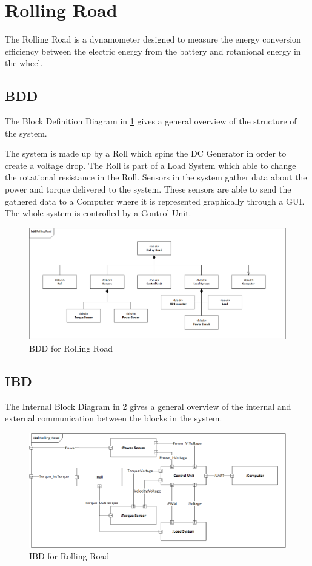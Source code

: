 \section{Rolling Road}
The Rolling Road is a dynamometer designed to measure the energy conversion efficiency  between the electric energy from the battery and rotanional energy in the wheel.

\subsection{BDD}
The Block Definition Diagram in \ref{fig:RR_BDD} gives a general overview of the structure of the system.

The system is made up by a Roll which spins the DC Generator in order to create a voltage drop. The Roll is part of a Load System which able to change the rotational resistance in the Roll.
Sensors in the system gather data about the power and torque delivered to the system. These sensors are able to send the gathered data to a Computer where it is represented graphically through a GUI. The whole system is controlled by a Control Unit.

\begin{figure}[H]
	\centering
	\includegraphics[width=0.9\linewidth]{Architecture/BDD_RollingRoad}
	\caption{BDD for Rolling Road}
	\label{fig:RR_BDD}
\end{figure}

\subsection{IBD}
The Internal Block Diagram in \ref{fig:RR_IBD} gives a general overview of the internal and external communication between the blocks in the system.



\begin{figure}[H]
	\centering
	\includegraphics[width=0.9\linewidth]{Architecture/IBD_RollingRoad}
	\caption{IBD for Rolling Road}
	\label{fig:RR_IBD}
\end{figure}

